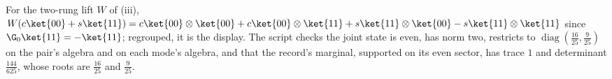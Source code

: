 For the two-rung lift $W$ of (iii), $W(c\ket{00} + s\ket{11}) = c\ket{00}\otimes\ket{00} + c\ket{00}\otimes\ket{11} + s\ket{11}\otimes\ket{00} - s\ket{11}\otimes\ket{11}$ since $\G_{0}\ket{11} = -\ket{11}$; regrouped, it is the display. The script checks the joint state is even, has norm two, restricts to $\operatorname{diag}(\tfrac{16}{25}, \tfrac{9}{25})$ on the pair's algebra and on each mode's algebra, and that the record's marginal, supported on its even sector, has trace $1$ and determinant $\tfrac{144}{625}$, whose roots are $\tfrac{16}{25}$ and $\tfrac{9}{25}$.
